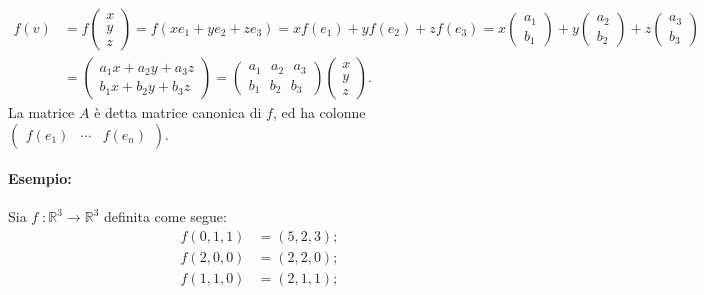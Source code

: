 \documentclass[a4paper]{article}
\begin{document}
        \[
                \begin{aligned}
                        f(v)    & = f \begin{pmatrix} x \\ y \\ z \end{pmatrix}
                                  = f(xe_1 + ye_2 + ze_3)
                                  = xf(e_1) + yf(e_2) + zf(e_3)
                                  = x \begin{pmatrix} a_1 \\ b_1 \end{pmatrix} + y \begin{pmatrix} a_2 \\ b_2 \end{pmatrix} + z \begin{pmatrix} a_3 \\ b_3 \end{pmatrix} \\
                                & = \begin{pmatrix}
                                        a_1 x + a_2 y  + a_3 z \\
                                        b_1 x + b_2 y + b_3 z
                                \end{pmatrix}
                                  = \begin{pmatrix}
                                        a_1 \mbox{ } a_2 \mbox{ } a_3 \\
                                        b_1 \mbox{ } b_2 \mbox{ } b_3
                                  \end{pmatrix}
                                  \begin{pmatrix} x \\ y \\ z \end{pmatrix}.
                \end{aligned}
        \]
        La matrice $A$ \`{e} detta matrice canonica di $f$, ed ha colonne
        $
                \begin{pmatrix}f(e_1) & \cdots & f(e_n)\end{pmatrix}
        $.

        \paragraph{Esempio:}
        Sia $f\;: \mathbb{R}^3 \to \mathbb{R}^3$ definita come segue:
        \[
                \begin{aligned}
                        f(0,1,1) & = (5,2,3); \\
                        f(2,0,0) & = (2,2,0); \\
                        f(1,1,0) & = (2,1,1); \\
                \end{aligned}
        \]
\end{document}
